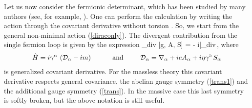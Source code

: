 Let us now consider the fermionic determinant, which 
has been studied by many authors (see, for example, 
\cite{gold,kimura,obukhov-spectr,buodsh,cogzer,gus}).
One can perform the calculation by writing the action
through the covariant derivative without torsion 
\cite{obukhov-spectr,buodsh}. So, we start 
from the general non-minimal action (\ref{diraconly}).
The divergent contribution from the single fermion 
loop is given by the expression
\beq
\Ga_{div} [g, A, S] = - i\Tr{}\Big|_{div}\,,
\label{efac}
\eeq
where
$$
{\hat H} =
i\gamma^\alpha \,\left({\cal D}_{\alpha} - im \right)
\,\,\,\,\,\,\,\,\,\,\,\,\,\,\,\,\,\,
{\rm and}\,\,\,\,\,\,\,\,\,\,\,\,\,\,\,
{\cal D}_\alpha =
\nabla_\alpha + ieA_\alpha + i\eta\gamma^5\,S_\alpha
$$
is generalized covariant derivative. For the massless theory 
this covariant derivative respects general covariance, the
abelian gauge symmetry (\ref{trans1}) and the 
additional gauge symmetry (\ref{trans}). In the massive case this last
symmetry is softly broken, but the above notation is still useful.

